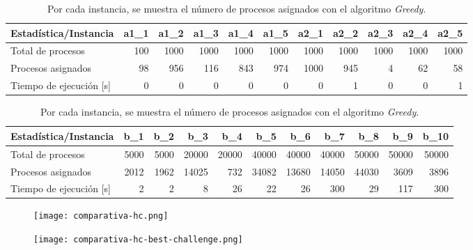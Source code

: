 \documentclass[../informe2.tex]{subfiles}
\begin{document}
\begin{table}[h]
	\small
	\centering
	\begin{tabular}{@{}lrrrrrrrrrr@{}}
		\toprule
		Estadística/Instancia       & a1\_1 & a1\_2 & a1\_3 & a1\_4 & a1\_5 & a2\_1 & a2\_2 & a2\_3 & a2\_4 & a2\_5 \\ \midrule
		Total de procesos           & 100   & 1000  & 1000  & 1000  & 1000  & 1000  & 1000  & 1000  & 1000  & 1000  \\
		Procesos asignados          & 98    & 956   & 116   & 843   & 974   & 1000  & 945   & 4     & 62    & 58    \\
		Tiempo de ejecución {[}s{]} & 0     & 0     & 0     & 0     & 0     & 0     & 1     & 0     & 0     & 1     \\ %
	\end{tabular}
	
	\bigskip
	
	\begin{tabular}{@{}lrrrrrrrrrr@{}}
		Estadística/Instancia       & b\_1 & b\_2 & b\_3  & b\_4  & b\_5  & b\_6  & b\_7  & b\_8  & b\_9  & b\_10 \\ \midrule
		Total de procesos           & 5000 & 5000 & 20000 & 20000 & 40000 & 40000 & 40000 & 50000 & 50000 & 50000 \\
		Procesos asignados          & 2012 & 1962 & 14025 & 732   & 34082 & 13680 & 14050 & 44030 & 3609  & 3896  \\
		Tiempo de ejecución {[}s{]} & 2    & 2    & 8     & 26    & 22    & 26    & 300   & 29    & 117   & 300   \\ \bottomrule
	\end{tabular}
	\caption{\small Por cada instancia, se muestra el número de procesos asignados con el algoritmo \textit{Greedy}.}
	\label{tabla:greedy}
\end{table}


\begin{figure}[ht]
	\centering
	\texttt{[image: comparativa-hc.png]}
	\caption{\small}
	\label{fig:comparativa-hc}
\end{figure}

\begin{figure}[ht]
	\centering
	\texttt{[image: comparativa-hc-best-challenge.png]}
	\caption{\small}
	\label{fig:comparativa-hc-best-challenge}
\end{figure}
\end{document}
